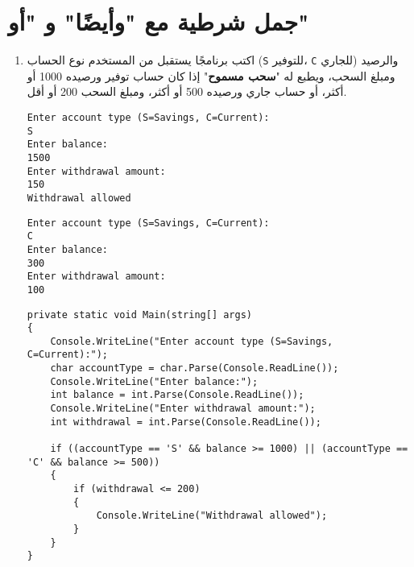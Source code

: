 \documentclass[12pt]{article}
\begin{document}
\begin{enumerate}[itemsep=3em]
\begin{enumerate}[itemsep=3em]
\begin{enumerate}[itemsep=3em]
\begin{enumerate}[itemsep=3em]
\begin{enumerate}
\end{enumerate}

\section{جمل شرطية مع "وأيضًا" و "أو"}

\ifdetailed
\begin{enumerate}[itemsep=3em]
\else
\begin{enumerate}
\fi

\item
اكتب برنامجًا يستقبل من المستخدم نوع الحساب (\texttt{S} للتوفير، \texttt{C} للجاري) والرصيد ومبلغ السحب، ويطبع له "\textbf{سحب مسموح}" إذا كان حساب توفير ورصيده 1000 أو أكثر، أو حساب جاري ورصيده 500 أو أكثر، ومبلغ السحب 200 أو أقل.
\ifdetailed
\begin{example}[1]
\begin{english}
\begin{lstlisting}
Enter account type (S=Savings, C=Current):
S
Enter balance:
1500
Enter withdrawal amount:
150
Withdrawal allowed
\end{lstlisting}
\end{english}
\end{example}
\begin{example}[2]
\begin{english}
\begin{lstlisting}
Enter account type (S=Savings, C=Current):
C
Enter balance:
300
Enter withdrawal amount:
100
\end{lstlisting}
\end{english}
\end{example}

\ifwithsols
\begin{solution}
\begin{english}
\begin{lstlisting}
private static void Main(string[] args)
{
    Console.WriteLine("Enter account type (S=Savings, C=Current):");
    char accountType = char.Parse(Console.ReadLine());
    Console.WriteLine("Enter balance:");
    int balance = int.Parse(Console.ReadLine());
    Console.WriteLine("Enter withdrawal amount:");
    int withdrawal = int.Parse(Console.ReadLine());

    if ((accountType == 'S' && balance >= 1000) || (accountType == 'C' && balance >= 500))
    {
        if (withdrawal <= 200)
        {
            Console.WriteLine("Withdrawal allowed");
        }
    }
}
\end{lstlisting}
\end{english}
\end{solution}
\clearpage
\fi
\fi


\end{enumerate}
\end{enumerate}
\end{enumerate}
\end{enumerate}
\end{enumerate}
\end{enumerate}
\end{document}
